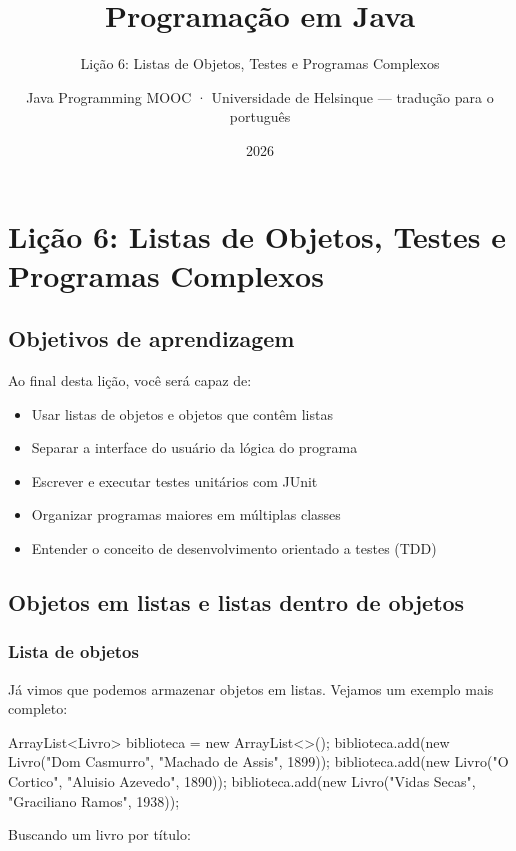 \documentclass[11pt,a4paper]{article}
\title{Programação em Java}
\subtitle{Lição 6: Listas de Objetos, Testes e Programas Complexos}
\author{Java Programming MOOC · Universidade de Helsinque --- tradução para o português}
\date{2026}
\begin{document}
\maketitle
{\hypersetup{linkcolor=javaDeep}\setcounter{tocdepth}{3}\tableofcontents}
\newpage

\section{Lição 6: Listas de Objetos, Testes e Programas Complexos}

\subsection{Objetivos de aprendizagem}

Ao final desta lição, você será capaz de:

\begin{itemize}
\item Usar listas de objetos e objetos que contêm listas
\item Separar a interface do usuário da lógica do programa
\item Escrever e executar testes unitários com JUnit
\item Organizar programas maiores em múltiplas classes
\item Entender o conceito de desenvolvimento orientado a testes (TDD)
\end{itemize}

\subsection{Objetos em listas e listas dentro de objetos}

\subsubsection{Lista de objetos}

Já vimos que podemos armazenar objetos em listas. Vejamos um exemplo mais completo:

\begin{javacode}
ArrayList<Livro> biblioteca = new ArrayList<>();
biblioteca.add(new Livro("Dom Casmurro", "Machado de Assis", 1899));
biblioteca.add(new Livro("O Cortico", "Aluisio Azevedo", 1890));
biblioteca.add(new Livro("Vidas Secas", "Graciliano Ramos", 1938));
\end{javacode}

Buscando um livro por título:
\end{document}
